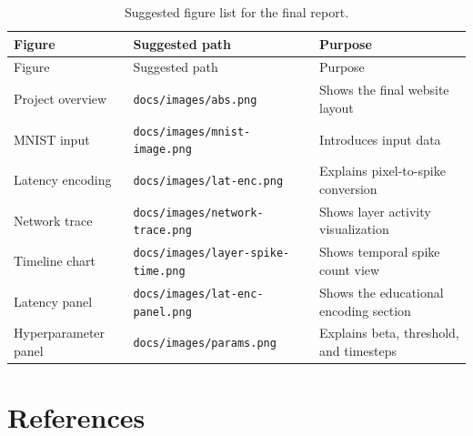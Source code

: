 \documentclass[11pt,a4paper]{article}
\begin{document}
\begin{longtable}{lll}
\caption{Suggested figure list for the final report.} \\
\toprule
Figure & Suggested path & Purpose \\
\midrule
\endfirsthead
\toprule
Figure & Suggested path & Purpose \\
\midrule
\endhead
Project overview & \texttt{docs/images/abs.png} & Shows the final website layout \\
MNIST input & \texttt{docs/images/mnist-image.png} & Introduces input data \\
Latency encoding & \texttt{docs/images/lat-enc.png} & Explains pixel-to-spike conversion \\
Network trace & \texttt{docs/images/network-trace.png} & Shows layer activity visualization \\
Timeline chart & \texttt{docs/images/layer-spike-time.png} & Shows temporal spike count view \\
Latency panel & \texttt{docs/images/lat-enc-panel.png} & Shows the educational encoding section \\
Hyperparameter panel & \texttt{docs/images/params.png} & Explains beta, threshold, and timesteps \\
\bottomrule
\end{longtable}

\section{References}
\end{document}
